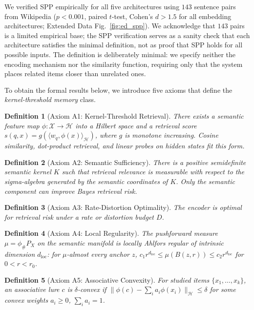 \documentclass[11pt]{article}
\newtheorem{definition}{Definition}
\begin{document}
\noindent We verified SPP empirically for all five architectures using $143$ sentence pairs from Wikipedia ($p < 0.001$, paired $t$-test, Cohen's $d > 1.5$ for all embedding architectures; Extended Data Fig.~\ref{fig:ed_spp}). We acknowledge that $143$ pairs is a limited empirical base; the SPP verification serves as a sanity check that each architecture satisfies the minimal definition, not as proof that SPP holds for all possible inputs. The definition is deliberately minimal: we specify neither the encoding mechanism nor the similarity function, requiring only that the system places related items closer than unrelated ones.

To obtain the formal results below, we introduce five axioms that define the \textit{kernel-threshold memory} class.

\begin{definition}[Axiom A1: Kernel-Threshold Retrieval]
There exists a semantic feature map $\phi: \mathcal{X} \to \mathcal{H}$ into a Hilbert space and a retrieval score $s(q,x) = g(\langle w_q, \phi(x)\rangle_{\mathcal{H}})$, where $g$ is monotone increasing. Cosine similarity, dot-product retrieval, and linear probes on hidden states fit this form.
\end{definition}

\begin{definition}[Axiom A2: Semantic Sufficiency]
There is a positive semidefinite semantic kernel $K$ such that retrieval relevance is measurable with respect to the sigma-algebra generated by the semantic coordinates of $K$. Only the semantic component can improve Bayes retrieval risk.
\end{definition}

\begin{definition}[Axiom A3: Rate-Distortion Optimality]
The encoder is optimal for retrieval risk under a rate or distortion budget $D$.
\end{definition}

\begin{definition}[Axiom A4: Local Regularity]
The pushforward measure $\mu = \phi_\# P_X$ on the semantic manifold is locally Ahlfors regular of intrinsic dimension $d_{\mathrm{loc}}$: for $\mu$-almost every anchor $z$, $c_1 r^{d_{\mathrm{loc}}} \le \mu(B(z,r)) \le c_2 r^{d_{\mathrm{loc}}}$ for $0 < r < r_0$.
\end{definition}

\begin{definition}[Axiom A5: Associative Convexity]
For studied items $\{x_1,\ldots,x_k\}$, an associative lure $c$ is $\delta$-convex if $\|\phi(c) - \sum_i a_i \phi(x_i)\|_{\mathcal{H}} \le \delta$ for some convex weights $a_i \ge 0$, $\sum_i a_i = 1$.
\end{definition}
\end{document}
